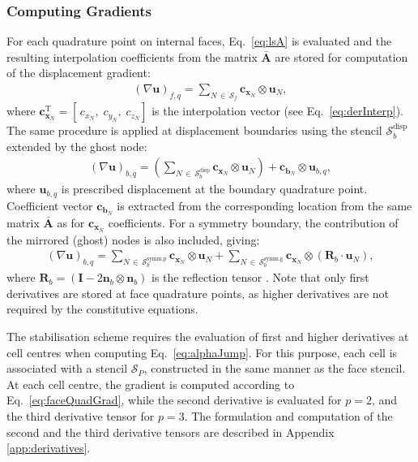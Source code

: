\documentclass[sn-mathphys,Numbered]{sn-jnl}%
\newcommand{\bb}{\boldsymbol}
\begin{document}
\subsubsection{Computing Gradients}
\label{sec:grad}
%
For each quadrature point on internal faces, Eq.~\eqref{eq:lsA} is evaluated and the resulting interpolation coefficients from the matrix $\mathbf{\bar{A}}$ are stored for computation of the displacement gradient:
%
\begin{eqnarray}\label{eq:faceQuadGrad}
(\nabla \bb{u})_{f,q} = \sum_{N \,\in\,  \mathcal{S}_f}  \bb{c}_{\bb{x}_N} \otimes \bb{u}_N,
\end{eqnarray}
%
where $\bb{c}_{\bb{x}_N}^{\mathrm{T}} = \left[ \,c_{x_N}, \; c_{y_N},\; c_{z_N} \right]$ is the interpolation vector (see Eq.~\eqref{eq:derInterp}).
The same procedure is applied at displacement boundaries using the stencil $\mathcal{S}_b^{\text{disp}}$  extended by the ghost node:
%
\begin{eqnarray}
(\nabla \bb{u})_{b,q} = \left(\sum_{N \,\in\,  \mathcal{S}_b^{\text{disp}}}  \bb{c}_{\bb{x}_N} \otimes \bb{u}_N \right)+ \bb{c}_{\bb{b}_N} \otimes \bb{u}_{b,q},
\end{eqnarray}
%
where $\bb{u}_{b,q}$ is prescribed displacement at the boundary quadrature point. Coefficient vector $\bb{c}_{\bb{b}_N}$ is extracted from the corresponding location from the same matrix $\mathbf{\bar{A}}$ as for $\bb{c}_{\bb{x}_N}$ coefficients.
For a symmetry boundary, the contribution of the mirrored (ghost) nodes is also included, giving:
%
\begin{eqnarray}
(\nabla \bb{u})_{b,q} =
\sum_{N \,\in\,  \mathcal{S}_b^{\text{symm,p}}}  \bb{c}_{\bb{x}_N} \otimes \bb{u}_N +
\sum_{N \,\in\,  \mathcal{S}_b^{\text{symm,g}}}  \bb{c}_{\bb{x}_N} \otimes ( \bb{R}_b \cdot \bb{u}_N),
\end{eqnarray}
%
where $ \bb{R}_b = (\bb{I}-2\bb{n}_b \otimes \bb{n}_b)$ is the reflection tensor \cite{Demirdzic2022}.
Note that only first derivatives are stored at face quadrature points, as higher derivatives are not required by the constitutive equations.

The stabilisation scheme requires the evaluation of first and higher derivatives at cell centres when computing Eq.~\eqref{eq:alphaJump}.
For this purpose, each cell is associated with a stencil $\mathcal{S}_P$, constructed in the same manner as the face stencil.
At each cell centre, the gradient is computed according to Eq.~\eqref{eq:faceQuadGrad}, while the second derivative is evaluated for $p = 2$, and the third derivative tensor for $p = 3$.
The formulation and computation of the second and the third derivative tensors are described in Appendix \ref{app:derivatives}.
%
%
\end{document}
